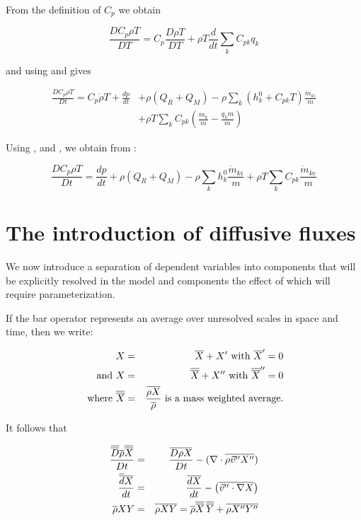  From the definition  of $C_{p}$ we obtain

\begin{equation}
\label{A.3.7}
\frac{DC_{p}\rho T}{DT}=
C_{p}\frac{D\rho T}{DT}+\rho T\frac{d}{dt}\sum_{k}C_{pk}q_{k}
\end{equation}

and using  and  gives

\begin{equation}
\begin{split}
\label{A.3.8}
\frac{DC_{p} \rho
T}{Dt}=C_{p}\dot{\rho}T+\frac{dp}{dt}&+\rho\left(Q_{R}+Q_{M}\right)-\rho\sum_{k} 
\left(h_{k}^0+C_{pk}T\right)\frac{\dot{m}_{ki}}{m}\\&+\rho T \sum_{k}
C_{pk}\left(\frac{\dot{m}_{k}}{m}-\frac{q_{k}\dot{m}}{m}\right)
\end{split}
\end{equation}

Using ,  and , we obtain from
:

\begin{equation}
\label{A.3.9}
\frac{DC_{p} \rho 
T}{Dt}=\frac{dp}{dt}+\rho\left(Q_{R}+Q_{M}\right)-\rho\sum_{k}
h^0_{k}\frac{\dot{m}_{ki}}{m}+\rho
T\sum_{k}C_{pk}\frac{\dot{m}_{ke}}{m}
\end{equation}

\section{The introduction of diffusive fluxes}\label{sA.4}

We now introduce
a separation of dependent variables into components that will be
explicitly resolved in the model and components the effect of which
will require parameterization.

If the bar operator represents an average over unresolved scales in
space and time, then we write:

\begin{eqnarray*}
X&=&\overline{X}+X' \mbox{ with } \overline{X}' = 0\\
\mbox{ and }X&=&\overline{\overline{X}}+X'' \mbox{ with } \overline{\overline{X}}''= 0\\
\mbox{ where }\overline{\overline{X}}&=&\frac{\overline{\rho X}}{\overline{\rho}} \mbox{
is a mass weighted average}.
\end{eqnarray*}

It follows that

\begin{eqnarray*}
\frac{\overline{\overline{D}}\overline{\rho}\overline{\overline{X}}}{Dt}&=&\frac{\overline{D\rho
X}}{Dt}-(\nabla \cdot \overline{\rho \vec{v}''X''})\\
\frac{\overline{\overline{d}}\overline{X}}{dt}&=&\frac{\overline{d
X}}{dt}-\left(\overline{\vec{v}'' \cdot \nabla X}\right)\\
\overline{\rho} XY&=&\overline{\rho XY} = \overline{\rho}\overline{\overline{X}}\,\overline{\overline{Y}}+
\overline{\rho X''Y''}
\end{eqnarray*}

